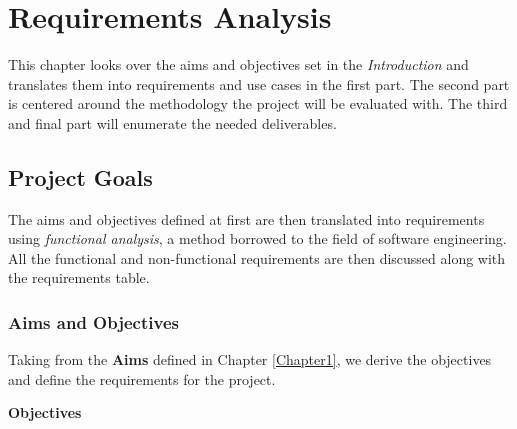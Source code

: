 \chapter{Requirements Analysis} %

\label{Chapter4} %



This chapter looks over the aims and objectives set in the \emph{Introduction} and translates them into requirements and use cases in the first part. The second part is centered around the methodology the project will be evaluated with. The third and final part will enumerate the needed deliverables.

\section{Project Goals}

The aims and objectives defined at first are then translated into requirements using \emph{functional analysis}, a method borrowed to the field of software engineering. All the functional and non-functional requirements are then discussed along with the requirements table.


\subsection{Aims and Objectives}

Taking from the \textbf{Aims} defined in Chapter \ref{Chapter1}, we derive the objectives and define the requirements for the project.

\textbf{Objectives}


